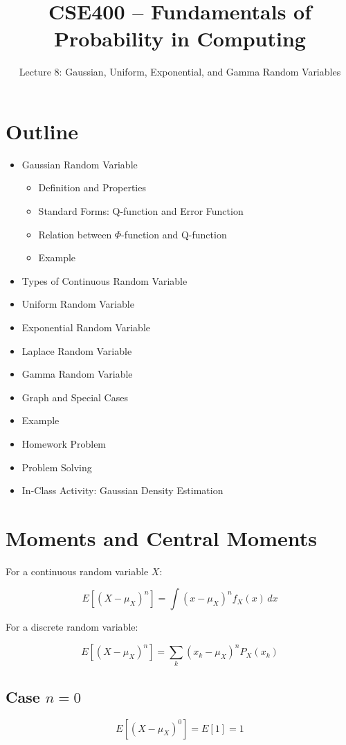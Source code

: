\documentclass[12pt]{article}
\title{CSE400 – Fundamentals of Probability in Computing}
\author{Lecture 8: Gaussian, Uniform, Exponential, and Gamma Random Variables}
\date{}
\begin{document}
\maketitle

\section*{Outline}

\begin{itemize}
\item Gaussian Random Variable
\begin{itemize}
\item Definition and Properties
\item Standard Forms: Q-function and Error Function
\item Relation between $\Phi$-function and Q-function
\item Example
\end{itemize}
\item Types of Continuous Random Variable
\item Uniform Random Variable
\item Exponential Random Variable
\item Laplace Random Variable
\item Gamma Random Variable
\item Graph and Special Cases
\item Example
\item Homework Problem
\item Problem Solving
\item In-Class Activity: Gaussian Density Estimation
\end{itemize}

\section*{Moments and Central Moments}

For a continuous random variable $X$:

\[
E[(X-\mu_X)^n] = \int (x-\mu_X)^n f_X(x)\, dx
\]

For a discrete random variable:

\[
E[(X-\mu_X)^n] = \sum_k (x_k-\mu_X)^n P_X(x_k)
\]

\subsection*{Case $n=0$}

\[
E[(X-\mu_X)^0] = E[1] = 1
\]
\end{document}
